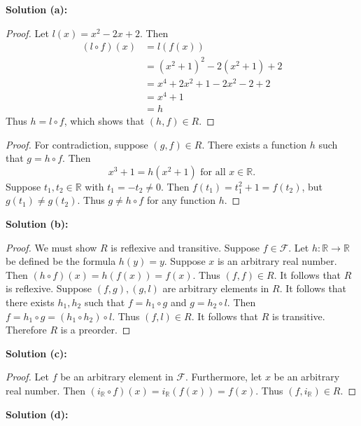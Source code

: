 \textbf{Solution (a):}

\begin{proof}
    Let $l(x) = x^2 - 2x + 2$. Then 
    \begin{align*}
    (l \circ f)(x) 
        &= l(f(x)) \\
        &= (x^2 + 1)^2 - 2(x^2 + 1) + 2 \\
        &= x^4 + 2x^2 + 1 - 2x^2 - 2 + 2 \\
        &= x^4 + 1 \\
        &= h
    \end{align*}
    Thus $h = l \circ f$, which shows that $(h, f) \in R$.
\end{proof}

\begin{proof}
    For contradiction, suppose $(g, f) \in R$.  
    There exists a function $h$ such that $g = h \circ f$. Then
    \[
    x^3 + 1 = h(x^2 + 1) \text{ for all } x \in \mathbb{R}.
    \]  
    Suppose $t_1, t_2 \in \mathbb{R}$ with $t_1 = -t_2 \ne 0$.  
    Then $f(t_1) = t_1^2 + 1 = f(t_2)$, but $g(t_1) \ne g(t_2)$.  
    Thus $g \ne h \circ f$ for any function $h$.
\end{proof}

\textbf{Solution (b):}

\begin{proof}
    We must show $R$ is reflexive and transitive.
    Suppose $f \in \mathcal{F}$.
    Let $h : \mathbb{R} \rightarrow \mathbb{R}$ be defined be the formula $h(y) = y$.
    Suppose $x$ is an arbitrary real number.
    Then $(h \circ f)(x) = h(f(x)) = f(x)$.
    Thus $(f, f) \in R$.
    It follows that $R$ is reflexive.
    Suppose $(f, g), (g, l)$ are arbitrary elements in $R$.
    It follows that there exists $h_1, h_2$ such that 
        $f = h_1 \circ g$ and $g = h_2 \circ l$.
    Then $f = h_1 \circ g = (h_1 \circ h_2) \circ l$.
    Thus $(f, l) \in R$.
    It follows that $R$ is transitive.
    Therefore $R$ is a  preorder.
\end{proof}

\textbf{Solution (c):}

\begin{proof}
    Let $f$ be an arbitrary element in $\mathcal{F}$.
    Furthermore, let $x$ be an arbitrary real number.
    Then $(i_{\mathbb{R}} \circ f)(x) = i_{\mathbb{R}}(f(x)) = f(x)$.
    Thus $(f, i_{\mathbb{R}}) \in R$.
\end{proof}

\textbf{Solution (d):}

